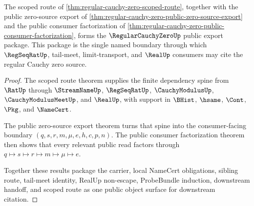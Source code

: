\begin{theorem}
\label{thm:regular-cauchy-zero-public-closure-package}
The scoped route of \autoref{thm:regular-cauchy-zero-scoped-route}, together with the public zero-source export of \autoref{thm:regular-cauchy-zero-public-zero-source-export} and the public consumer factorization of \autoref{thm:regular-cauchy-zero-public-consumer-factorization}, forms the $\RegularCauchyZeroUp$ public export package. This package is the single named boundary through which $\RegSeqRatUp$, tail-meet, limit-transport, and $\RealUp$ consumers may cite the regular Cauchy zero source.
\end{theorem}
\begin{proof}
The scoped route theorem supplies the finite dependency spine from $\RatUp$ through $\StreamNameUp$, $\RegSeqRatUp$, $\CauchyModulusUp$, $\CauchyModulusMeetUp$, and $\RealUp$, with support in $\BHist$, $\hsame$, $\Cont$, $\Pkg$, and $\NameCert$.

The public zero-source export theorem turns that spine into the consumer-facing boundary $(q,s,r,m,\mu,e,h,c,p,n)$. The public consumer factorization theorem then shows that every relevant public read factors through $q \mapsto s \mapsto r \mapsto m \mapsto \mu \mapsto e$.

Together these results package the carrier, local NameCert obligations, sibling route, tail-meet identity, RealUp non-escape, ProbeBundle induction, downstream handoff, and scoped route as one public object surface for downstream citation.
\end{proof}

